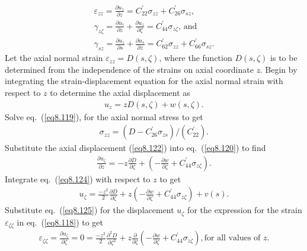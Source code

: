 \documentclass{AeroStructure-ERJohnson}
\begin{document}
\begin{gather}
\varepsilon_{z z}=\frac{\partial u_{z}}{\partial
z}=C_{22}^{\prime} \sigma_{z z}+C_{26}^{\prime} \sigma_{s z},\label{eq8.119}\\
\gamma_{z \zeta}=\frac{\partial u_{\tau}}{\partial
z}+\frac{\partial u_{z}}{\partial \zeta}=C_{44}^{\prime} \sigma_{z
\zeta}\mbox{, and }\label{eq8.120}\\
\gamma_{s z}=\frac{\partial u_{z}}{\partial s}+\frac{\partial
u_{s}}{\partial z}=C_{62}^{\prime} \sigma_{z z}+C_{66}^{\prime}
\sigma_{s z}.\label{eq8.121}
\end{gather}
Let the axial normal strain $\varepsilon_{z z}=D(s, \zeta)$, where
the function $D(s, \zeta)$ is to be determined from the
independence of the strains on axial coordinate \textit{z. }Begin
by integrating the strain-displacement equation for the axial
normal strain with respect to $z$ to determine the axial
displacement as
\begin{align}\label{eq8.122}
u_{z}=z D(s, \zeta)+w(s, \zeta).
\end{align}
Solve eq.~(\ref{eq8.119}), for the axial normal stress to get
\begin{align}\label{eq8.123}
\sigma_{z z}=\left(D-C_{26}^{\prime} \sigma_{z s}\right)
/\left(C_{22}^{\prime}\right).
\end{align}
Substitute the axial displacement (\ref{eq8.122}) into
eq.~(\ref{eq8.120}) to find
\begin{align}\label{eq8.124}
\frac{\partial u_{\zeta}}{\partial z}=-z \frac{\partial
D}{\partial \zeta}+\left(-\frac{\partial w}{\partial
\zeta}+C^{\prime}_{44} \sigma_{z \zeta}\right).
\end{align}
Integrate eq.~(\ref{eq8.124}) with respect to $z$ to get
\begin{align}\label{eq8.125}
u_{\zeta}=\frac{-z^{2}}{2} \frac{\partial D}{\partial
\zeta}+z\left(-\frac{\partial w}{\partial \zeta}+C^{\prime}_{44} \sigma_{z \zeta}\right)+v(s).
\end{align}
Substitute eq.~(\ref{eq8.125}) for the displacement $u_{\zeta}$
for the expression for the strain $\varepsilon_{\zeta \zeta}$ in
eq.~(\ref{eq8.118}) to get
\begin{align}\label{eq8.126}
\varepsilon_{\zeta \zeta}=\frac{\partial u_{\zeta}}{\partial
\zeta}=0=\frac{-z^{2}}{2} \frac{\partial^{2} D}{\partial
\zeta^{2}}+z \frac{\partial}{\partial \zeta}\left(-\frac{\partial
w}{\partial \zeta}+C^{\prime}_{44} \sigma_{z \zeta}\right),
\mbox{for all values of $z$.}
\end{align}
\end{document}
